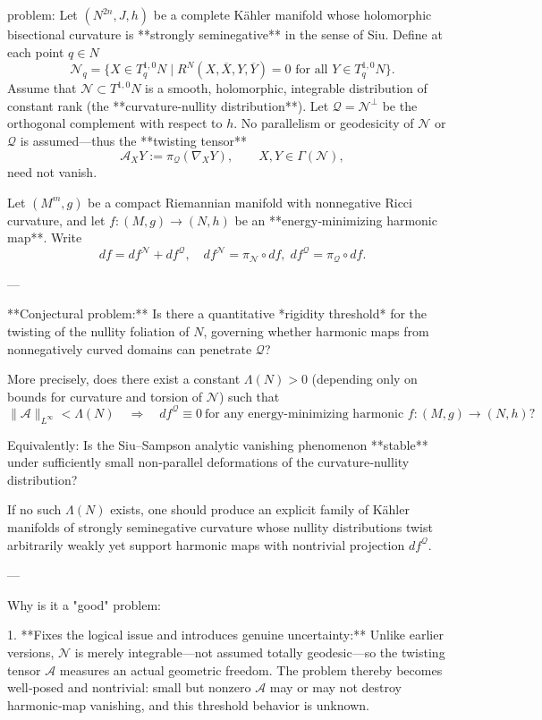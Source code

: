 problem:  
Let \((N^{2n},J,h)\) be a complete Kähler manifold whose holomorphic bisectional curvature is **strongly seminegative** in the sense of Siu.  
Define at each point \(q\in N\)
\[
\mathcal N_q=\{X\in T^{1,0}_qN\mid R^N(X,\overline{X},Y,\overline{Y})=0\text{ for all }Y\in T_q^{1,0}N\}.
\]
Assume that \(\mathcal N\subset T^{1,0}N\) is a smooth, holomorphic, integrable distribution of constant rank (the **curvature‑nullity distribution**).  
Let \(\mathcal Q=\mathcal N^\perp\) be the orthogonal complement with respect to \(h\).  No parallelism or geodesicity of \(\mathcal N\) or \(\mathcal Q\) is assumed—thus the **twisting tensor**
\[
\mathcal A_XY:=\pi_\mathcal Q(\nabla_XY),\qquad X,Y\in\Gamma(\mathcal N),
\]
need not vanish.

Let \((M^m,g)\) be a compact Riemannian manifold with nonnegative Ricci curvature, and let \(f:(M,g)\to(N,h)\) be an **energy‑minimizing harmonic map**.  Write
\[
df=df^\mathcal N+df^\mathcal Q,
\quad df^\mathcal N=\pi_\mathcal N\circ df,\;
df^\mathcal Q=\pi_\mathcal Q\circ df.
\]

---

**Conjectural problem:**  
Is there a quantitative *rigidity threshold* for the twisting of the nullity foliation of \(N\), governing whether harmonic maps from nonnegatively curved domains can penetrate \( \mathcal Q\)?  

More precisely, does there exist a constant \(\Lambda(N)>0\) (depending only on bounds for curvature and torsion of \(\mathcal N\)) such that
\[
\|\mathcal A\|_{L^\infty}<\Lambda(N)
\quad\Longrightarrow\quad
df^\mathcal Q\equiv0
\ \text{for any energy‑minimizing harmonic }f:(M,g)\to(N,h)?
\]

Equivalently: Is the Siu–Sampson analytic vanishing phenomenon **stable** under sufficiently small non‑parallel deformations of the curvature‑nullity distribution?

If no such \(\Lambda(N)\) exists, one should produce an explicit family of Kähler manifolds of strongly seminegative curvature whose nullity distributions twist arbitrarily weakly yet support harmonic maps with nontrivial projection \(df^\mathcal Q\).

---

Why is it a "good" problem:  

1. **Fixes the logical issue and introduces genuine uncertainty:**  
   Unlike earlier versions, \(\mathcal N\) is merely integrable—not assumed totally geodesic—so the twisting tensor \(\mathcal A\) measures an actual geometric freedom.  The problem thereby becomes well‑posed and nontrivial: small but nonzero \(\mathcal A\) may or may not destroy harmonic‑map vanishing, and this threshold behavior is unknown.

